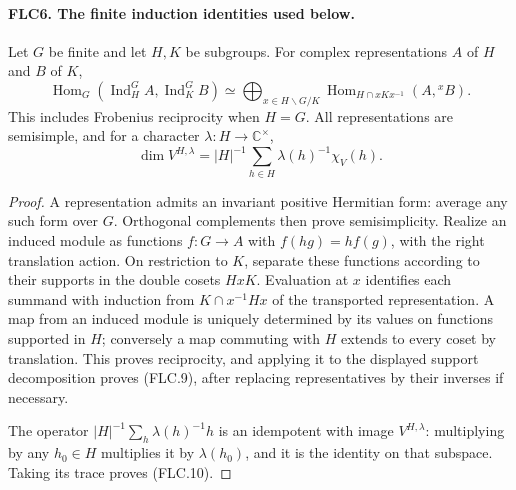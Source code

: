 \documentclass[11pt,a4paper]{article}
\numberwithin{equation}{section}
\theoremstyle{remark}\newtheorem{remark}[theorem]{Remark}
\begin{document}
\paragraph{FLC6. The finite induction identities used below.}
\label{claim:FLC6}
Let $G$ be finite and let $H,K$ be subgroups.  For complex
representations $A$ of $H$ and $B$ of $K$,
\[
 \operatorname{Hom}_G(\operatorname{Ind}_H^G A,
                          \operatorname{Ind}_K^G B)
 \simeq\bigoplus_{x\in H\backslash G/K}
 \operatorname{Hom}_{H\cap xKx^{-1}}(A,{}^xB).
 \tag{FLC.9}
\]
This includes Frobenius reciprocity when $H=G$.
All representations are semisimple, and for a character
$\lambda:H\to\mathbb C^\times$,
\[
 \dim V^{H,\lambda}
       =|H|^{-1}\sum_{h\in H}\lambda(h)^{-1}\chi_V(h).
 \tag{FLC.10}
\]
\begin{proof}
A representation admits an invariant positive Hermitian form:
average any such form over $G$.  Orthogonal complements then
prove semisimplicity.  Realize an induced module as functions
$f:G\to A$ with $f(hg)=h f(g)$, with the right translation
action.  On restriction to $K$, separate these functions
according to their supports in the double cosets $HxK$.
Evaluation at $x$ identifies each summand with induction from
$K\cap x^{-1}Hx$ of the transported representation.  A map
from an induced module is uniquely determined by its values
on functions supported in $H$; conversely a map commuting with
$H$ extends to every coset by translation.  This proves
reciprocity, and applying it to the displayed support
decomposition proves (FLC.9), after replacing representatives
by their inverses if necessary.

The operator $|H|^{-1}\sum_h\lambda(h)^{-1}h$ is an idempotent
with image $V^{H,\lambda}$: multiplying by any $h_0\in H$
multiplies it by $\lambda(h_0)$, and it is the identity on that
subspace.  Taking its trace proves (FLC.10).
\end{proof}

\end{document}
